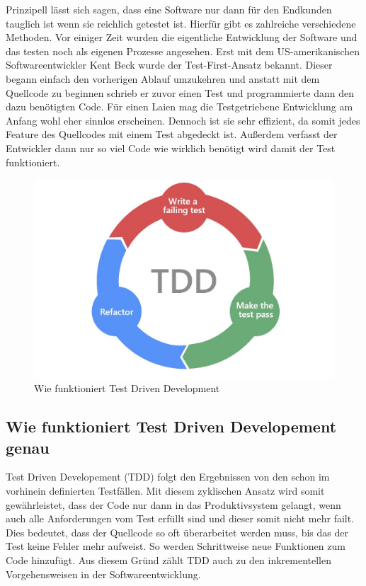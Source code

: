 Prinzipell lässt sich sagen, dass eine Software nur dann für den Endkunden tauglich ist wenn sie reichlich getestet ist. Hierfür gibt es zahlreiche verschiedene Methoden. Vor einiger Zeit wurden die eigentliche Entwicklung der Software und das testen noch als eigenen Prozesse angesehen. Erst mit dem US-amerikanischen Softwareentwickler Kent Beck wurde der Test-First-Ansatz bekannt. Dieser begann einfach den vorherigen Ablauf umzukehren und anstatt mit dem Quellcode zu beginnen schrieb er zuvor einen Test und programmierte dann den dazu benötigten Code. Für einen Laien mag die Testgetriebene Entwicklung am Anfang wohl eher sinnlos erscheinen. Dennoch ist sie sehr effizient, da somit jedes Feature des Quellcodes mit einem Test abgedeckt ist. Außerdem verfasst der Entwickler dann nur so viel Code wie wirklich benötigt wird damit der Test funktioniert.

\begin{figure}
    \centering
    \includegraphics[width=0.5\linewidth]{pics/tdd.jpeg}
    \caption{Wie funktioniert Test Driven Development}
    \label{fig:enter-label}
\end{figure}

\subsection{Wie funktioniert Test Driven Developement genau}

Test Driven Developement (TDD) folgt den Ergebnissen von den schon im vorhinein definierten Testfällen. Mit diesem zyklischen Ansatz wird somit gewährleistet, dass der Code nur dann in das Produktivsystem gelangt, wenn auch alle Anforderungen vom Test erfüllt sind und dieser somit nicht mehr failt. Dies bedeutet, dass der Quellcode so oft überarbeitet werden muss, bis das der Test keine Fehler mehr aufweist. So werden Schrittweise neue Funktionen zum Code hinzufügt. Aus diesem Gründ zählt TDD auch zu den inkrementellen Vorgehensweisen in der Softwareentwicklung.



\cite{Was_ist_TDD}

